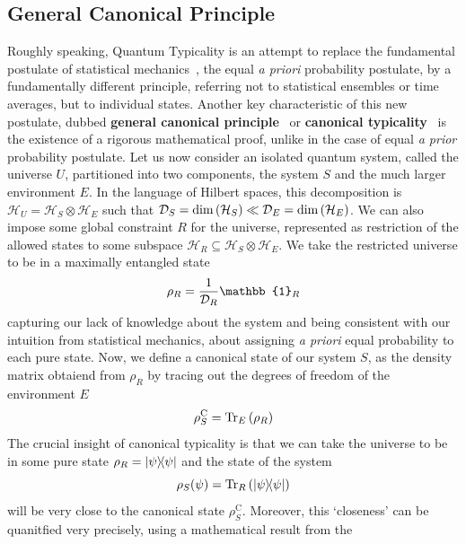 \subsection{\label{sec:gcp} General Canonical Principle}
Roughly speaking, Quantum Typicality is an attempt to replace the fundamental postulate of statistical mechanics~\autocite{Huang1987},
the equal \textit{a priori} probability postulate, by a fundamentally different principle, referring not to
statistical ensembles or time averages, but to individual states. Another key characteristic of
this new postulate, dubbed \textbf{general canonical principle}~\autocite{Popescu2006} or \textbf{canonical typicality}~\autocite{Goldstein2006}
is the existence of a rigorous mathematical proof, unlike in the case of equal
\textit{a prior} probability postulate. Let us now consider an isolated quantum system, called the universe \(U\), partitioned
into two components, the system \(S\) and the much larger environment \(E\). In the language of Hilbert spaces, this decomposition is
\(\mathcal{H}_U = \mathcal{H}_S \otimes \mathcal{H}_E\) such that \(\mathcal{D}_S = \mathrm{dim}\left(\mathcal{H}_S\right)
\ll \mathcal{D}_E = \mathrm{dim}\left(\mathcal{H}_E\right)\). We can also impose some global constraint \(R\) for the universe, represented
as restriction of the allowed states to some subspace \(\mathcal{H}_R \subseteq  \mathcal{H}_S \otimes \mathcal{H}_E \).
We take the restricted universe to be in a maximally entangled state
\begin{equation}
	\rho_R = \frac{1}{\dimension_R} \mathbb{1}_R
\end{equation}
capturing our lack of knowledge about the system and being consistent with our intuition from statistical mechanics, about assigning
\textit{a priori} equal probability to each pure state. Now, we define a canonical state of our system \(S\), as the density
matrix obtaiend from \(\rho_R\) by tracing out the degrees of freedom of the environment \(E\)
\begin{equation}
	\rho_S^{\mathrm{C}} = \Tr_E\left(\rho_R\right)
\end{equation}
The crucial insight of canonical typicality is that we can take the universe to be in some pure state \(\rho_R = \ketbra{\psi}{\psi}\)
and the state of the system
\begin{equation}
	\rho_S(\psi) = \Tr_R \left(\ketbra{\psi}{\psi}\right)
\end{equation}
will be very close to the canonical state
\(\rho_S^{\mathrm{C}}\). Moreover, this `closeness' can be quanitfied very precisely, using a mathematical result from the
